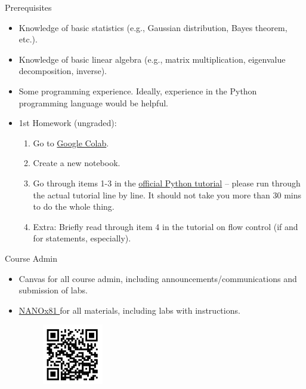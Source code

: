 \documentclass[aspectratio=169]{beamer}
\begin{document}
\begin{frame}{Prerequisites}
    \begin{itemize}
        \item Knowledge of basic statistics (e.g., Gaussian distribution, Bayes theorem, etc.).
        \item Knowledge of basic linear algebra (e.g., matrix multiplication, eigenvalue decomposition, inverse).
        \item Some programming experience. Ideally, experience in the Python programming language would be helpful.
        \item 1st Homework (ungraded):
        \begin{enumerate}
            \item Go to \href{https://colab.research.google.com/}{Google Colab}.
            \item Create a new notebook.
            \item Go through items 1-3 in the \href{http://docs.python.org/3/tutorial/}{official Python tutorial} – please run through the actual tutorial line by line. It should not take you more than 30 mins to do the whole thing.
            \item Extra: Briefly read through item 4 in the tutorial on flow control (if and for statements, especially).
        \end{enumerate}
    \end{itemize}
\end{frame}

\begin{frame}{Course Admin}
    \begin{itemize}
        \item Canvas for all course admin, including announcements/communications and submission of labs.
        \item \href{https://materialsvirtuallab.github.io/nano281/}{NANOx81 } for all materials, including labs with instructions.
        \begin{figure}
            \centering
            \includegraphics[width=0.25\textwidth]{figures/QR-NANO281Github.png}
            \label{fig:my_label}
        \end{figure}
    \end{itemize}
\end{frame}
\end{document}

